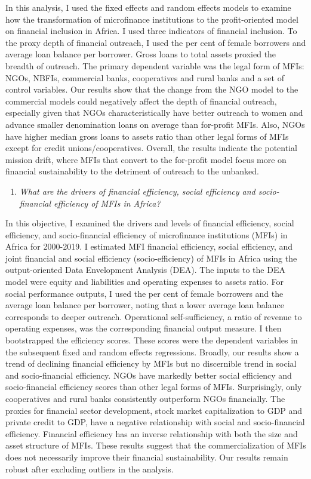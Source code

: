 \documentclass[a4paper, nobind]{templates/ociamthesis}
\providecommand{\tightlist}{%
  \setlength{\itemsep}{0pt}\setlength{\parskip}{0pt}}
\begin{document}
In this analysis, I used the fixed effects and random effects models to examine how the transformation of microfinance institutions to the profit-oriented model on financial inclusion in Africa. I used three indicators of financial inclusion. To the proxy depth of financial outreach, I used the per cent of female borrowers and average loan balance per borrower. Gross loans to total assets proxied the breadth of outreach. The primary dependent variable was the legal form of MFIs: NGOs, NBFIs, commercial banks, cooperatives and rural banks and a set of control variables. Our results show that the change from the NGO model to the commercial models could negatively affect the depth of financial outreach, especially given that NGOs characteristically have better outreach to women and advance smaller denomination loans on average than for-profit MFIs. Also, NGOs have higher median gross loans to assets ratio than other legal forms of MFIs except for credit unions/cooperatives. Overall, the results indicate the potential mission drift, where MFIs that convert to the for-profit model focus more on financial sustainability to the detriment of outreach to the unbanked.

\begin{enumerate}
\def\labelenumi{\arabic{enumi}.}
\setcounter{enumi}{2}
\tightlist
\item
  \emph{What are the drivers of financial efficiency, social efficiency and socio-financial efficiency of MFIs in Africa?}
\end{enumerate}

In this objective, I examined the drivers and levels of financial efficiency, social efficiency, and socio-financial efficiency of microfinance institutions (MFIs) in Africa for 2000-2019. I estimated MFI financial efficiency, social efficiency, and joint financial and social efficiency (socio-efficiency) of MFIs in Africa using the output-oriented Data Envelopment Analysis (DEA). The inputs to the DEA model were equity and liabilities and operating expenses to assets ratio. For social performance outputs, I used the per cent of female borrowers and the average loan balance per borrower, noting that a lower average loan balance corresponds to deeper outreach. Operational self-sufficiency, a ratio of revenue to operating expenses, was the corresponding financial output measure. I then bootstrapped the efficiency scores. These scores were the dependent variables in the subsequent fixed and random effects regressions. Broadly, our results show a trend of declining financial efficiency by MFIs but no discernible trend in social and socio-financial efficiency. NGOs have markedly better social efficiency and socio-financial efficiency scores than other legal forms of MFIs. Surprisingly, only cooperatives and rural banks consistently outperform NGOs financially. The proxies for financial sector development, stock market capitalization to GDP and private credit to GDP, have a negative relationship with social and socio-financial efficiency. Financial efficiency has an inverse relationship with both the size and asset structure of MFIs. These results suggest that the commercialization of MFIs does not necessarily improve their financial sustainability. Our results remain robust after excluding outliers in the analysis.
\end{document}
